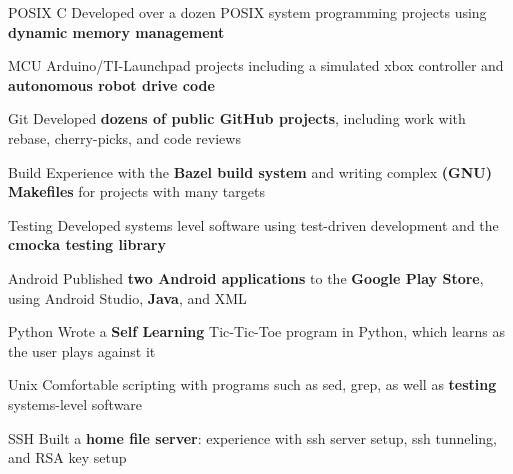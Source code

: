 \begin{cvskills}

 \cvskill
    {POSIX C} %
    {Developed over a dozen POSIX system programming projects using \textbf{dynamic memory management}}%

 \cvskill
    {MCU} %
    {Arduino/TI-Launchpad projects including a simulated xbox controller and \textbf{autonomous robot drive code}} %

 \cvskill
    {Git} %
    {Developed \textbf{dozens of public GitHub projects}, including work with rebase, cherry-picks, and code reviews} %

 \cvskill
    {Build} %
    {Experience with the \textbf{Bazel build system} and writing complex \textbf{(GNU) Makefiles} for projects with many targets} %

 \cvskill
    {Testing} %
    {Developed systems level software using test-driven development and the \textbf{cmocka testing library}} %
    
 \cvskill
    {Android} %
    {Published \textbf{two Android applications} to the \textbf{Google Play Store}, using Android Studio, \textbf{Java}, and XML} %

 
 \cvskill
    {Python} %
    {Wrote a \textbf{Self Learning} Tic-Tic-Toe program in Python, which learns as the user plays against it} %


 \cvskill
    {Unix} %
    {Comfortable scripting with programs such as sed, grep, as well as \textbf{testing} systems-level software} %

 \cvskill
    {SSH} %
    {Built a \textbf{home file server}: experience with ssh server setup, ssh tunneling, and RSA key setup} %



\end{cvskills}

